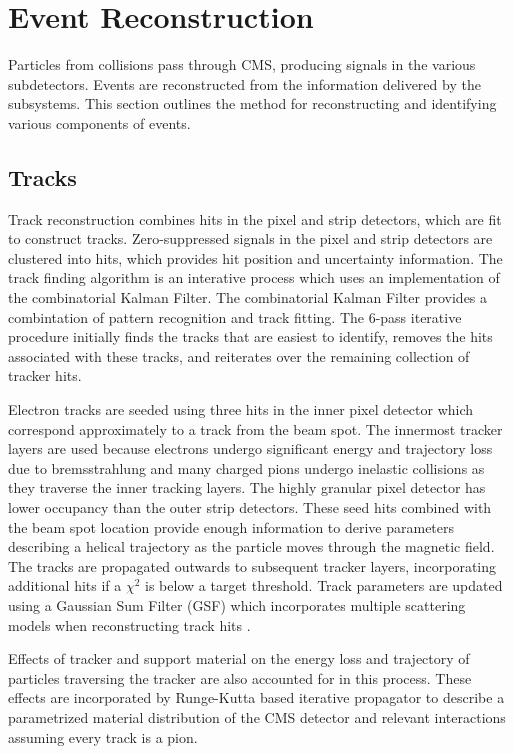 \chapter{Event Reconstruction}\label{ch:reco}
Particles from collisions pass through CMS, producing signals in the various subdetectors. Events are reconstructed from the information delivered by the subsystems. This section outlines the method for reconstructing and identifying various components of events.

\section{Tracks}
Track reconstruction combines hits in the pixel and strip detectors, which are fit to construct tracks. Zero-suppressed signals in the pixel and strip detectors are clustered into hits, which provides hit position and uncertainty information. The track finding algorithm is an interative process which uses an implementation of the combinatorial Kalman Filter. The combinatorial Kalman Filter provides a combintation of pattern recognition and track fitting. The 6-pass iterative procedure initially finds the tracks that are easiest to identify, removes the hits associated with these tracks, and reiterates over the remaining collection of tracker hits. \cite{Chatrchyan:2014fea}

Electron tracks are seeded using three hits in the inner pixel detector which correspond approximately to a track from the beam spot. The innermost tracker layers are used because electrons undergo significant energy and trajectory loss due to bremsstrahlung and many charged pions undergo inelastic collisions as they traverse the inner tracking layers. The highly granular pixel detector has lower occupancy than the outer strip detectors. These seed hits combined with the beam spot location provide enough information to derive parameters describing a helical trajectory as the particle moves through the magnetic field. The tracks are propagated outwards to subsequent tracker layers, incorporating additional hits if a $\chi^2$ is below a target threshold. Track parameters are updated using a Gaussian Sum Filter (GSF) which incorporates multiple scattering models when reconstructing track hits \cite{Adam:2005cg}. 

Effects of tracker and support material on the energy loss and trajectory of particles traversing the tracker are also accounted for in this process. These effects are incorporated by Runge-Kutta based iterative propagator to describe a parametrized material distribution of the CMS detector and relevant interactions assuming every track is a pion. 

